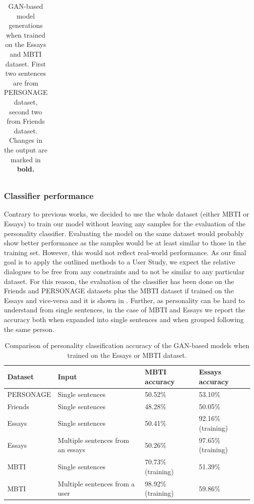 \documentclass[nomenclature, english, biblatex]{kththesis}
\begin{document}
\begin{table}
\begin{adjustbox}{max width=\textwidth}
\begin{tabular}{|p{}|p{}|p{}|p{}|}
        \hline
        \end{tabular}
    \end{adjustbox}
    \caption{GAN-based model generations when trained on the Essays and MBTI dataset. First two sentences are from PERSONAGE dataset, second two from Friends dataset. Changes in the output are marked in \textbf{bold.}}
    \label{tab:mbti_essays_results}
\end{table}
\subsubsection{Classifier performance}
\label{sec:gan_classifier}
Contrary to previous works, we decided to use the whole dataset (either MBTI or Essays) to train our model without leaving any samples for the evaluation of the personality classifier. Evaluating the model on the same dataset would probably show better performance as the samples would be at least similar to those in the training set. However, this would not reflect real-world performance. As our final goal is to apply the outlined methods to a User Study, we expect the relative dialogues to be free from any constraints and to not be similar to any particular dataset. For this reason, the evaluation of the classifier has been done on the Friends and PERSONAGE datasets plus the MBTI dataset if trained on the Essays and vice-versa and it is shown in . Further, as personality can be hard to understand from single sentences, in the case of MBTI and Essays we report the accuracy both when expanded into single sentences and when grouped following the same person.
\begin{table}
    \centering
    \begin{adjustbox}{max width=\textwidth}
        \begin{tabular}{|p{}|p{}|p{}|p{}|}
        \hline
        Dataset & Input & MBTI accuracy & Essays accuracy \\
        \hline
        \hline
        PERSONAGE & Single sentences & 50.52\% & 53.10\%\\
        \hline
        Friends & Single sentences & 48.28\% & 50.05\%\\
        \hline
        Essays & Single sentences & 50.41\% & 92.16\% (training)\\
        \hline
        Essays & Multiple sentences from an essays & 50.26\% & 97.65\% (training)\\
        \hline
        MBTI & Single sentences & 70.73\% (training) & 51.39\%\\
        \hline
        MBTI & Multiple sentences from a user & 98.92\% (training) & 59.86\%\\
        \hline
        \end{tabular}
    \end{adjustbox}
    \caption{Comparison of personality classification accuracy of the GAN-based models when trained on the Essays or MBTI dataset.}
    \label{tab:mbti_essays_classifier}
\end{table}
\end{document}
